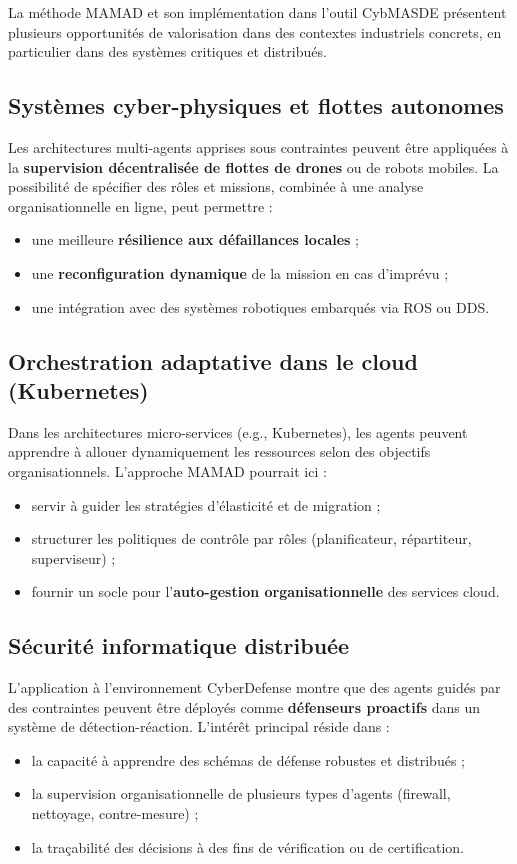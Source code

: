 \noindent
La méthode \ac{MAMAD} et son implémentation dans l’outil CybMASDE présentent plusieurs opportunités de valorisation dans des contextes industriels concrets, en particulier dans des systèmes critiques et distribués.

\subsection*{Systèmes cyber-physiques et flottes autonomes}

Les architectures multi-agents apprises sous contraintes peuvent être appliquées à la \textbf{supervision décentralisée de flottes de drones} ou de robots mobiles. La possibilité de spécifier des rôles et missions, combinée à une analyse organisationnelle en ligne, peut permettre :
\begin{itemize}
    \item une meilleure \textbf{résilience aux défaillances locales} ;
    \item une \textbf{reconfiguration dynamique} de la mission en cas d’imprévu ;
    \item une intégration avec des systèmes robotiques embarqués via ROS ou DDS.
\end{itemize}

\subsection*{Orchestration adaptative dans le cloud (Kubernetes)}

Dans les architectures micro-services (e.g., Kubernetes), les agents peuvent apprendre à allouer dynamiquement les ressources selon des objectifs organisationnels. L’approche MAMAD pourrait ici :
\begin{itemize}
    \item servir à guider les stratégies d’élasticité et de migration ;
    \item structurer les politiques de contrôle par rôles (planificateur, répartiteur, superviseur) ;
    \item fournir un socle pour l’\textbf{auto-gestion organisationnelle} des services cloud.
\end{itemize}

\subsection*{Sécurité informatique distribuée}

L’application à l’environnement CyberDefense montre que des agents guidés par des contraintes peuvent être déployés comme \textbf{défenseurs proactifs} dans un système de détection-réaction. L’intérêt principal réside dans :
\begin{itemize}
    \item la capacité à apprendre des schémas de défense robustes et distribués ;
    \item la supervision organisationnelle de plusieurs types d’agents (firewall, nettoyage, contre-mesure) ;
    \item la traçabilité des décisions à des fins de vérification ou de certification.
\end{itemize}

